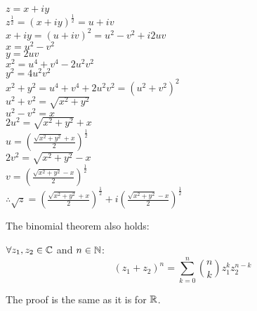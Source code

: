 \documentclass[letterpaper,12pt,fleqn]{article}
\begin{document}
\begin{theproof}
$z=x+iy$ \\
$z^{\frac{1}{2}}=(x+iy)^{\frac{1}{2}}=u+iv$ \\
$x+iy=(u+iv)^2=u^2-v^2+i2uv$ \\
$x=u^2-v^2$ \\
$y=2uv$ \\
$x^2=u^4+v^4-2u^2v^2$ \\
$y^2=4u^2v^2$ \\
$x^2+y^2=u^4+v^4+2u^2v^2=(u^2+v^2)^2$ \\
$u^2+v^2=\sqrt{x^2+y^2}$ \\
$u^2-v^2=x$ \\
$2u^2=\sqrt{x^2+y^2}+x$ \\
$u=\left(\frac{\sqrt{x^2+y^2}+x}{2}\right)^{\frac{1}{2}}$ \\
$2v^2=\sqrt{x^2+y^2}-x$ \\
$v=\left(\frac{\sqrt{x^2+y^2}-x}{2}\right)^{\frac{1}{2}}$ \\
$\therefore \sqrt{z}=\left(\frac{\sqrt{x^2+y^2}+x}{2}\right)^{\frac{1}{2}}+
    i\left(\frac{\sqrt{x^2+y^2}-x}{2}\right)^{\frac{1}{2}}$
\end{theproof}

The binomial theorem also holds:
\begin{theorem}
$\forall z_1,z_2\in\mathbb{C}$ and $n\in\mathbb{N}$:
\[(z_1+z_2)^n=\sum_{k=0}^{n}\binom{n}{k}z_1^kz_2^{n-k}\]
\end{theorem}
The proof is the same as it is for $\mathbb{R}$.
\end{document}
